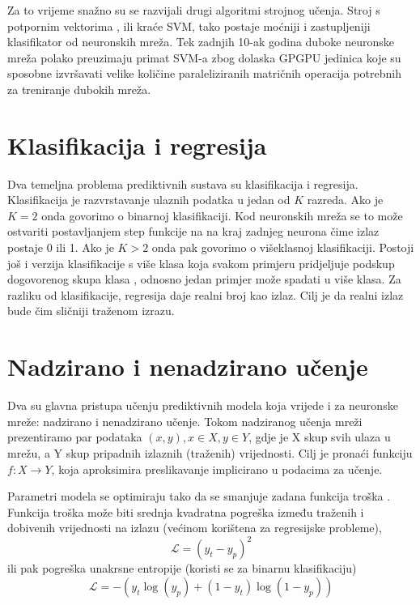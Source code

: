 \documentclass[times, utf8, diplomski, numeric]{fer}
\begin{document}
Za to vrijeme snažno su se razvijali drugi algoritmi strojnog učenja. Stroj s potpornim vektorima , ili kraće SVM, tako postaje moćniji i zastupljeniji klasifikator od neuronskih mreža. Tek zadnjih 10-ak godina duboke neuronske mreža polako preuzimaju primat SVM-a zbog dolaska GPGPU  jedinica koje su sposobne izvršavati velike količine paraleliziranih matričnih operacija potrebnih za treniranje dubokih mreža.

\section{Klasifikacija i regresija}
Dva temeljna problema prediktivnih sustava su klasifikacija i regresija.
Klasifikacija je razvrstavanje ulaznih podatka u jedan od $K$ razreda. Ako je $K = 2$ onda govorimo o binarnoj klasifikaciji. Kod neuronskih mreža se to može ostvariti postavljanjem step funkcije na na kraj zadnjeg neurona čime izlaz postaje 0 ili 1.
Ako je $K > 2$ onda pak govorimo o višeklasnoj  klasifikaciji. Postoji još i verzija klasifikacije s više klasa koja svakom primjeru pridjeljuje podskup dogovorenog skupa klasa , odnosno jedan primjer može spadati u više klasa.
Za razliku od klasifikacije, regresija daje realni broj kao izlaz. Cilj je da realni izlaz bude čim sličniji traženom izrazu.

\section{Nadzirano i nenadzirano učenje}
Dva su glavna pristupa učenju prediktivnih modela koja vrijede i za neuronske mreže: nadzirano i nenadzirano učenje. Tokom nadziranog učenja mreži prezentiramo par podataka $(x, y), x \in X, y \in Y$, gdje je X skup svih ulaza u mrežu, a Y skup pripadnih izlaznih (traženih) vrijednosti.
Cilj je pronaći funkciju $f: X \to Y$, koja aproksimira preslikavanje implicirano u podacima za učenje.

Parametri modela se optimiraju tako da se smanjuje zadana funkcija troška . Funkcija troška može biti srednja kvadratna pogreška između traženih i dobivenih vrijednosti na izlazu (većinom korištena za regresijske probleme),
\begin{equation}
	\mathcal{L} = (y_t - y_p)^2
\end{equation}
ili pak pogreška unakrsne entropije (koristi se za binarnu klasifikaciju)
\begin{equation}
	\mathcal{L} = -(y_t \log(y_p) + (1 - y_t) \log(1 - y_p))
\end{equation}
\end{document}
